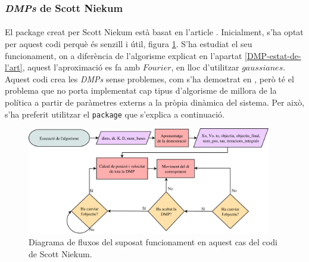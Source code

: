 \documentclass[12pt,a4paper,final,twoside]{article}
\begin{document}
\subsubsection{\textit{DMPs} de Scott Niekum}

\paragraph{}El package creat per Scott Niekum està basat en l'article \cite{Pastor2009}. Inicialment, s'ha optat per aquest codi perquè és senzill i útil, figura \ref{fig:diagrama-sniekum}. S'ha estudiat el seu funcionament, on a diferència de l'algorisme explicat en l'apartat \ref{DMP-estat-de-l'art}, aquest l'aproximació es fa amb $Fourier$, en lloc d'utilitzar $gaussianes$. Aquest codi crea les \textit{DMPs} sense problemes, com s'ha demostrat en \cite{Pfeiffer2014}, però té el problema que no porta implementat cap tipus d'algorisme de millora de la política a partir de paràmetres externs a la pròpia dinàmica del sistema. Per això, s'ha preferit utilitzar el \texttt{package} que s'explica a continuació.

\begin{figure}[tb]
\centering
\includegraphics[width=0.95\textwidth]{Imatges/diagrama-sniekum.pdf}
\caption[Diagrama fluxos del codi de Scott Niekum]{Diagrama de fluxos del suposat funcionament en aquest cas del codi de Scott Niekum.}
\label{fig:diagrama-sniekum}
\end{figure}

\end{document}
